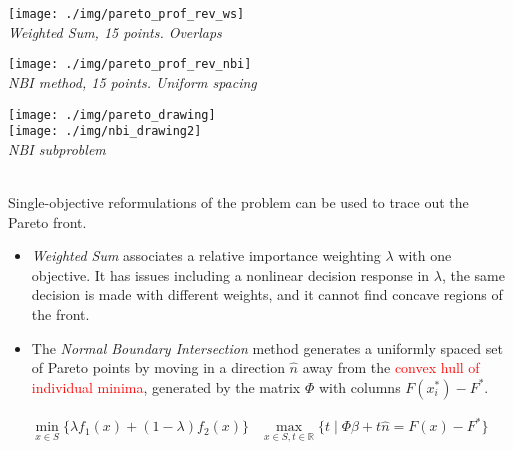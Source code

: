 \documentclass[a0paper,landscape,fontscale=0.35]{baposter}
\newcommand{\mycaption}[1]{
  {
    \smaller
    \emph{#1}
  }
}
\begin{document}
\begin{poster}
{\begin{minipage}[h]{0.7\textwidth}
    \begin{minipage}{\textwidth}
      \begin{minipage}{0.5\textwidth}
        \centering
        \texttt{[image: ./img/pareto\_prof\_rev\_ws]}\\
        \mycaption{Weighted Sum, 15 points. Overlaps}
      \end{minipage}%
      \begin{minipage}{0.5\textwidth}
        \centering
        \texttt{[image: ./img/pareto\_prof\_rev\_nbi]}\\
        \mycaption{NBI method, 15 points. Uniform spacing}
      \end{minipage}
    \end{minipage}
  \end{minipage}%
  \begin{minipage}[h]{0.3\textwidth}
    \centering
    \texttt{[image: ./img/pareto\_drawing]}
    \\[0.5em]
    \texttt{[image: ./img/nbi\_drawing2]}\\
    \mycaption{NBI subproblem}
  \end{minipage}\\[1em]

  Single-objective reformulations of the problem can be used to
  trace out the Pareto front.
  \begin{itemize}
  \item \emph{Weighted Sum} associates a relative importance weighting
    $\lambda$ with one
    objective. It has issues including a nonlinear decision
    response in $\lambda$,
    the same decision is made with different weights, and
    it cannot find concave regions of the front.
  \item The \emph{Normal Boundary Intersection} method
    \citep{das1998normal}
    generates a uniformly spaced set of Pareto points by moving
    in a direction $\hat n$ away from the \textcolor{red}{convex hull of individual minima},
    generated by the matrix $\Phi$ with columns $F(x_i^*)-F^*$.
  \end{itemize}
  \vspace{-0.8em}
  \begin{align}
    &
      \min_{x\in S}\{\lambda f_1(x)+(1-\lambda)f_2(x)\}
    &
      \max_{x\in S, t\in \mathbb R} \{t\mid \Phi\beta+t\hat n =
      F(x)-F^*\}
    &
  \end{align}
}


\end{poster}
\end{document}
